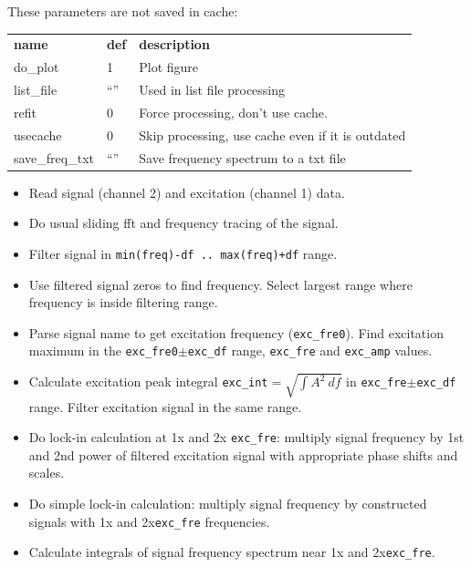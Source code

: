 \documentclass[a4paper]{article}
\begin{document}
These parameters are not saved in cache:

\medskip\noindent
\begin{tabular}{p{3cm}p{1cm}p{13cm}}\hline
\bf name & \bf def & \bf description\\
do\_plot   & 1    & Plot figure \\
list\_file & ``'' & Used in list file processing \\
refit      & 0    & Force processing, don't use cache.\\
usecache   & 0    & Skip processing, use cache even if it is outdated\\
save\_freq\_txt & ``'' & Save frequency spectrum to a txt file\\
\hline
\end{tabular}
\medskip

\medskip{}

\begin{itemize}
\item Read signal (channel 2) and excitation (channel 1) data.
\item Do usual sliding fft and frequency tracing of the signal.
\item Filter signal in {\tt min(freq)-df .. max(freq)+df} range.
\item Use filtered signal zeros to find frequency. Select largest
      range where frequency is inside filtering range.
\item Parse signal name to get excitation frequency ({\tt exc\_fre0}).
      Find excitation maximum in the {\tt exc\_fre0}$\pm${\tt exc\_df} range,
      {\tt exc\_fre} and {\tt exc\_amp} values.
\item Calculate excitation peak integral {\tt exc\_int}$=\sqrt{\int A^2\ df}$
      in {\tt exc\_fre}$\pm${\tt exc\_df} range. Filter excitation signal
      in the same range.
\item Do lock-in calculation at 1x and 2x {\tt exc\_fre}: multiply signal
      frequency by 1st and 2nd power of filtered excitation signal with
      appropriate phase shifts and scales.
\item Do simple lock-in calculation: multiply signal
      frequency by constructed signals with 1x and 2x{\tt exc\_fre} frequencies.
\item Calculate integrals of signal frequency spectrum near 1x and 2x{\tt exc\_fre}.
\end{itemize}
\medskip

\medskip{}
\end{document}
